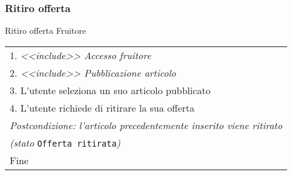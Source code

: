 \begin{minipage}{\textwidth}
    \subsubsection{Ritiro offerta}
    \usecase
        {Ritiro offerta}
        {
            Fruitore %
        }
        {
            \begin{tabular}{l}
                1. \textit{<<include>> Accesso fruitore}\\
                2. \textit{<<include>> Pubblicazione articolo}\\
                3. L'utente seleziona un suo articolo pubblicato\\
                4. L'utente richiede di ritirare la sua offerta\\
                \textit{Postcondizione: l'articolo precedentemente inserito viene ritirato}\\
                \textit{(stato }\texttt{Offerta ritirata}\textit{)}\\
                Fine
            \end{tabular}\\


        }
        \vspace{0.5cm}
\end{minipage}
